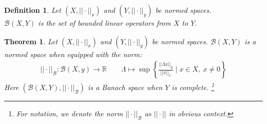 \documentclass[11pt]{book}
\theoremstyle{break}
\theoremstyle{break}
\newtheorem{thm}{Theorem}[section]
\newtheorem{defn}{Definition}[corL]
\newcommand{\R}{\mathbb{R}}
\begin{document}
\begin{defn}
Let $(X,||\cdot ||_x)$ and $(Y,||\cdot ||_y)$ be normed spaces. \\
$\mathcal{B}(X,Y)$ is the set of bounded linear operators from $X$ to $Y$. 
\end{defn}

\begin{thm}
Let $(X,||\cdot ||_x)$ and $(Y,||\cdot ||_y)$ be normed spaces. $\mathcal{B}(X,Y)$ is a normed space when equipped with the norm:
\begin{align*}
||\cdot ||_{\mathcal{B}}: \mathcal{B}(X,y) \to \R \qquad \Lambda \mapsto \sup\left\{\frac{||\Lambda x||_y}{||x||_x}\mid x \in X, \ x\neq 0 \right\}
\end{align*}
Here $(\mathcal{B}(X,Y), ||\cdot ||_{\mathcal{B}})$ is a Banach space when $Y$ is complete. \footnote{For notation, we denote the norm $||\cdot ||_\mathcal{B}$ as $||\cdot ||$ in obvious context.}
\end{thm}
\end{document}
